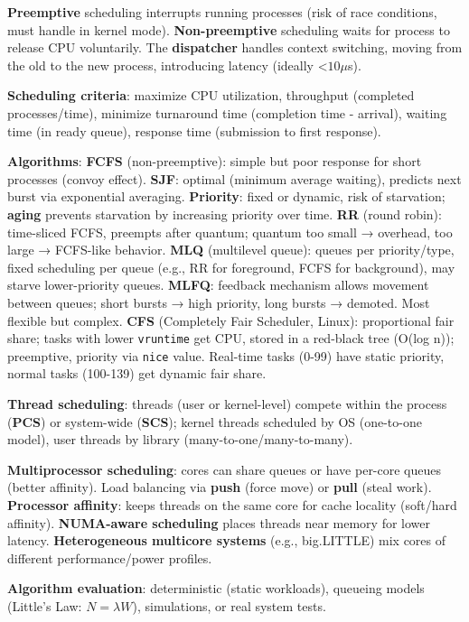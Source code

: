 \textbf{Preemptive} scheduling interrupts running processes (risk of race conditions, must handle in kernel mode). \textbf{Non-preemptive} scheduling waits for process to release CPU voluntarily. The \textbf{dispatcher} handles context switching, moving from the old to the new process, introducing latency (ideally <$10\mu$s).

\textbf{Scheduling criteria}: maximize CPU utilization, throughput (completed processes/time), minimize turnaround time (completion time - arrival), waiting time (in ready queue), response time (submission to first response).

\textbf{Algorithms}:
\textbf{FCFS} (non-preemptive): simple but poor response for short processes (convoy effect).
\textbf{SJF}: optimal (minimum average waiting), predicts next burst via exponential averaging.
\textbf{Priority}: fixed or dynamic, risk of starvation; \textbf{aging} prevents starvation by increasing priority over time.  
\textbf{RR} (round robin): time-sliced FCFS, preempts after quantum; quantum too small → overhead, too large → FCFS-like behavior.  
\textbf{MLQ} (multilevel queue): queues per priority/type, fixed scheduling per queue (e.g., RR for foreground, FCFS for background), may starve lower-priority queues.
\textbf{MLFQ}: feedback mechanism allows movement between queues; short bursts → high priority, long bursts → demoted. Most flexible but complex.
\textbf{CFS} (Completely Fair Scheduler, Linux): proportional fair share; tasks with lower \texttt{vruntime} get CPU, stored in a red-black tree (O(log n)); preemptive, priority via \texttt{nice} value. Real-time tasks (0-99) have static priority, normal tasks (100-139) get dynamic fair share.

\textbf{Thread scheduling}: threads (user or kernel-level) compete within the process (\textbf{PCS}) or system-wide (\textbf{SCS}); kernel threads scheduled by OS (one-to-one model), user threads by library (many-to-one/many-to-many).  

\textbf{Multiprocessor scheduling}: cores can share queues or have per-core queues (better affinity). Load balancing via \textbf{push} (force move) or \textbf{pull} (steal work). \textbf{Processor affinity}: keeps threads on the same core for cache locality (soft/hard affinity). \textbf{NUMA-aware scheduling} places threads near memory for lower latency. \textbf{Heterogeneous multicore systems} (e.g., big.LITTLE) mix cores of different performance/power profiles.

\textbf{Algorithm evaluation}: deterministic (static workloads), queueing models (Little's Law: $N=\lambda W$), simulations, or real system tests.